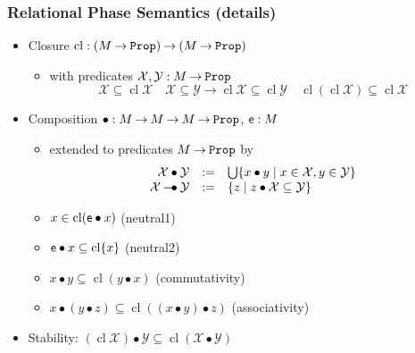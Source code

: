 \documentclass[xcolor=pdftex,graphicx=pdftex,12pt]{beamer}
\newcommand{\coq}[1]{\ensuremath{\mathalpha{\mathtt{#1}}}}
\newcommand{\cfun}{\mathbin{\rightarrow}}
\newcommand{\Prop}{\coq{Prop}}
\newcommand{\cdef}{\mathrel{\mathtt{:=}}}
\newcommand{\cl}{\mathop{\mathrm{cl}}}
\newcommand{\mmult}{\mathbin{\bullet}}
\newcommand{\mimp}{\mathbin{\multimap\mskip -14mu\bullet}}
\newcommand{\munit}{\mathalpha{\mathsf e}}
\newcommand{\set}[1]{\mathcal{#1}}
\begin{document}
\begin{frame}

\frametitle{Relational Phase Semantics (details)}

\begin{itemize}
\item Closure $\cl: (M\cfun\Prop)\cfun (M\cfun\Prop)$ 
  \begin{itemize}
  \item with predicates $\set X,\set Y:M\cfun\Prop$
  $$\set X\subseteq\cl \set X\quad \set X\subseteq \set Y\cfun \cl{\set X}\subseteq \cl{\set Y}\quad\cl(\cl\set X)\subseteq \cl \set X$$
  \end{itemize}
\item Composition ${\mmult}: M\cfun M\cfun M\cfun\Prop$, $\munit: M$
  \begin{itemize}
  \item extended to predicates $M\cfun\Prop$ by
  $$ \begin{array}{rcl}
     \set X\mmult \set Y & \cdef & \bigcup\{x\mmult y\mid x\in\set X, y\in\set Y\}\\ 
     \set X\mimp \set Y & \cdef & \{ z\mid z\mmult \set X\subseteq\set Y\}
   \end{array}$$
  \item $x\in\cl(\munit\mmult x)$ \quad (neutral1)
  \item $\munit\mmult x \subseteq \cl\{x\}$ \quad (neutral2)
  \item $x\mmult y\subseteq \cl(y\mmult x)$ \quad (commutativity)
  \item $x\mmult(y\mmult z)\subseteq\cl((x\mmult y)\mmult z)$ \quad (associativity)
  \end{itemize}
\medskip
\item Stability: $(\cl\set X)\mmult\set Y\subseteq\cl(\set X\mmult\set Y)$
\end{itemize}

\end{frame}
\end{document}
